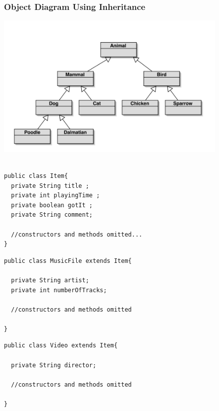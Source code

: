 \documentclass{beamer}
\begin{document}
\begin{frame}
\frametitle {Object Diagram Using Inheritance}
\begin{center}
\includegraphics[height=7cm, keepaspectratio]{images/inheritance2}
\end{center}
\end{frame}

\begin{frame}[fragile]
\begin{block}{}
\begin{lstlisting}

public class Item{
  private String title ; 
  private int playingTime ; 
  private boolean gotIt ; 
  private String comment;

  //constructors and methods omitted...
}
\end{lstlisting}
\end{block}
\end{frame}

\begin{frame}[fragile]
\begin{block}{}
\begin{lstlisting}
public class MusicFile extends Item{
	
  private String artist;
  private int numberOfTracks;
	
  //constructors and methods omitted	
	
}
\end{lstlisting}
\end{block}

\begin{block}{}
\begin{lstlisting}
public class Video extends Item{
	
  private String director;
	
  //constructors and methods omitted	
	
}
\end{lstlisting}
\end{block}
\end{frame}
\end{document}

